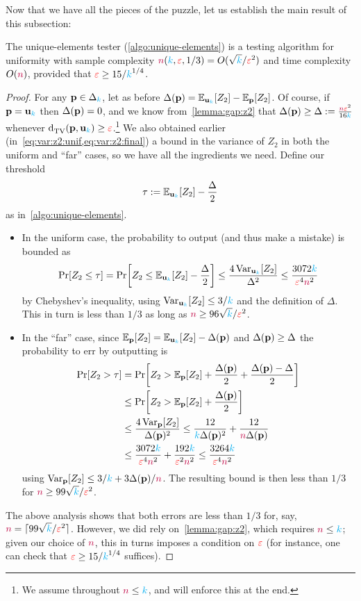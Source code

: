 Now that we have all the pieces of the puzzle, let us establish the main result of this subsection:
\begin{theorem}
  \label{theo:uniformity:unique:elements}
The unique-elements tester (\cref{algo:unique-elements}) is a testing algorithm for uniformity with sample complexity ${\textcolor{purple}{n}}({\textcolor{cyan}{k}},\textcolor{red}{\varepsilon},1/3) = O(\sqrt{{\textcolor{cyan}{k}}}/\textcolor{red}{\varepsilon}^2)$ and time complexity $O({\textcolor{purple}{n}})$, provided that $\textcolor{red}{\varepsilon} \geq 15/{\textcolor{cyan}{k}}^{1/4}$.
\end{theorem}
\begin{proof}
For any $\mathbf{p}\in\Delta_{{\textcolor{cyan}{k}}}$, let as before $\Delta(\p) = \bE{\uniform_\ab}{Z_2} - \bE{\p}{Z_2}$. Of course, if $\mathbf{p}=\mathbf{u}_{\textcolor{cyan}{k}}$ then $\Delta(\mathbf{p})=0$, and we know from~\cref{lemma:gap:z2} that $\Delta(\mathbf{p}) \geq \Delta := \frac{{\textcolor{purple}{n}}\textcolor{red}{\varepsilon}^2}{16{\textcolor{cyan}{k}}}$ whenever $\totalvardist{\p}{\uniform_\ab} \geq \dst$.\footnote{We assume throughout ${\textcolor{purple}{n}} \leq {\textcolor{cyan}{k}}$, and will enforce this at the end.} We also obtained earlier (in~\cref{eq:var:z2:unif,eq:var:z2:final}) a bound in the variance of $Z_2$ in both the uniform and ``far'' cases, so we have all the ingredients we need. Define our threshold
\[
    \tau \eqdef \bE{\uniform_\ab}{Z_2} - \frac{\Delta}{2}
\]
as in~\cref{algo:unique-elements}.
\begin{itemize}
    \item In the uniform case, the probability to output \reject (and thus make a mistake) is bounded as
    \[
    \bPr{Z_2 \leq \tau} = \bPr{Z_2 \leq \bE{\uniform_\ab}{Z_2} - \frac{\Delta}{2} } \leq \frac{4\Var_{\uniform_\ab}[Z_2]}{\Delta^2}
    \leq \frac{3072\ab}{\dst^4\ns^2}
    \]
    by Chebyshev's inequality, using $\operatorname{Var}_{\mathbf{u}_{\textcolor{cyan}{k}}}[Z_2] \leq 3/{\textcolor{cyan}{k}}$ and the definition of $\Delta$. This in turn is less than $1/3$ as long as ${\textcolor{purple}{n}} \geq 96\sqrt{{\textcolor{cyan}{k}}}/\textcolor{red}{\varepsilon}^2$.
    \item In the ``far'' case, since $\bE{\p}{Z_2} = \bE{\uniform_\ab}{Z_2} - \Delta(\p)$ and $\Delta(\mathbf{p}) \geq \Delta$ the probability to err by outputting \accept is
    \begin{align*}
        \bPr{Z_2 > \tau} &= \bPr{Z_2 > \bE{\p}{Z_2} + \frac{\Delta(\p)}{2} + \frac{\Delta(\p)-\Delta}{2} } \\       
        &\leq \bPr{Z_2 > \bE{\p}{Z_2} + \frac{\Delta(\p)}{2} } \\
        &\leq \frac{4\Var_{\p}[Z_2]}{\Delta(\p)^2} 
        \leq \frac{12}{\ab \Delta(\p)^2} + \frac{12}{\ns \Delta(\p)} \\
        &\leq \frac{3072\ab}{\dst^4\ns^2} + \frac{192\ab}{\dst^2\ns^2} \leq \frac{3264\ab}{\dst^4\ns^2}
    \end{align*}
    using $\operatorname{Var}_{\mathbf{p}}[Z_2] \leq 3/{\textcolor{cyan}{k}}+3\Delta(\mathbf{p})/{\textcolor{purple}{n}}$. The resulting bound is then less than $1/3$ for ${\textcolor{purple}{n}} \geq 99\sqrt{{\textcolor{cyan}{k}}}/\textcolor{red}{\varepsilon}^2$.
  \end{itemize}
  The above analysis shows that both errors are less than $1/3$ for, say, ${\textcolor{purple}{n}} = \lceil{99\sqrt{{\textcolor{cyan}{k}}}/\textcolor{red}{\ensuremath{\varepsilon}}^2}\rceil$. However, we did rely on~\cref{lemma:gap:z2}, which requires ${\textcolor{purple}{n}} \leq {\textcolor{cyan}{k}}$; given our choice of ${\textcolor{purple}{n}}$, this in turns imposes a condition on $\textcolor{red}{\varepsilon}$ (for instance, one can check that $\textcolor{red}{\varepsilon} \geq 15/{\textcolor{cyan}{k}}^{1/4}$ suffices).
\end{proof}


